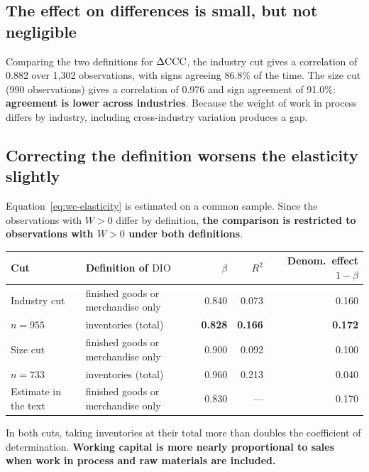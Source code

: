 \subsection{The effect on differences is small, but not negligible}

Comparing the two definitions for $\Delta\mathrm{CCC}$, the industry cut gives a correlation of 0.882 over
1,302 observations, with signs agreeing 86.8\% of the time. The size cut (990 observations) gives
a correlation of 0.976 and sign agreement of 91.0\%: \textbf{agreement is lower across
industries}. Because the weight of work in process differs by industry, including cross-industry
variation produces a gap.

\subsection{Correcting the definition worsens the elasticity slightly}

Equation~\eqref{eq:wc-elasticity} is estimated on a common sample. Since the observations with
$W>0$ differ by definition, \textbf{the comparison is restricted to observations with $W>0$ under
both definitions}.

\begin{center}
\begin{tabular}{@{}P{0.18\textwidth}P{0.30\textwidth}rrr@{}}
\toprule
Cut & Definition of $\mathrm{DIO}$ & $\beta$ & $R^2$ & Denom.\ effect $1-\beta$ \\
\midrule
Industry cut & finished goods or merchandise only & 0.840 & 0.073 & 0.160 \\
$n=955$ & inventories (total) & \textbf{0.828} & \textbf{0.166} & \textbf{0.172} \\
\midrule
Size cut & finished goods or merchandise only & 0.900 & 0.092 & 0.100 \\
$n=733$ & inventories (total) & 0.960 & 0.213 & 0.040 \\
\midrule
Estimate in the text & finished goods or merchandise only & 0.830 & --- & 0.170 \\
\bottomrule
\end{tabular}
\label{tab:inventory-elasticity}
\end{center}

In both cuts, taking inventories at their total more than doubles the coefficient of
determination. \textbf{Working capital is more nearly proportional to sales when work in process
and raw materials are included.}

